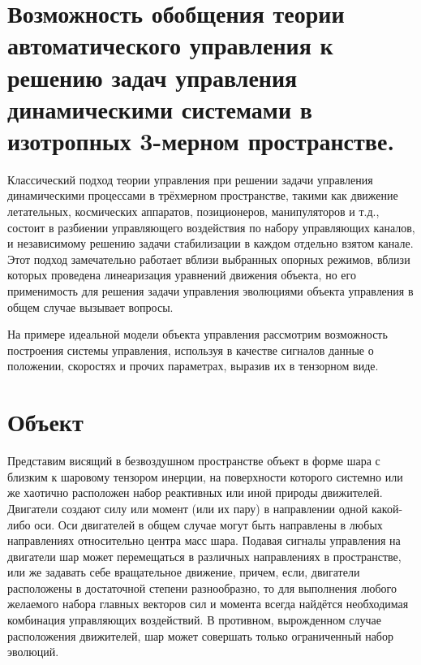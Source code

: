 \documentclass[a4paper]{article}
\begin{document}

\section{Возможность обобщения теории автоматического управления к решению задач управления динамическими системами в изотропных 3-мерном пространстве.}
Классический подход теории управления при решении задачи управления динамическими процессами в трёхмерном пространстве, такими как движение летательных, космических аппаратов, позиционеров, манипуляторов и т.д., состоит в разбиении управляющего воздействия по набору управляющих каналов, и независимому решению задачи стабилизации в каждом отдельно взятом канале. Этот подход замечательно работает вблизи выбранных опорных режимов, вблизи которых проведена линеаризация уравнений движения объекта, но его применимость для решения задачи управления эволюциями объекта управления в общем случае вызывает вопросы.

На примере идеальной модели объекта управления рассмотрим возможность построения системы управления, используя в качестве сигналов данные о положении, скоростях и прочих параметрах, выразив их в тензорном виде.

\section{Объект}
Представим висящий в безвоздушном пространстве объект в форме шара с близким к шаровому тензором инерции, на поверхности которого системно или же хаотично расположен набор реактивных или иной природы движителей. Двигатели создают силу или момент (или их пару) в направлении одной какой-либо оси. Оси двигателей в общем случае могут быть направлены в любых направлениях относительно центра масс шара. Подавая сигналы управления на двигатели шар может перемещаться в различных направлениях в пространстве, или же задавать себе вращательное движение, причем, если, двигатели расположены в достаточной степени разнообразно, то для выполнения любого желаемого набора главных векторов сил и момента всегда найдётся необходимая комбинация управляющих воздействий. В противном, вырожденном случае расположения движителей, шар может совершать только ограниченный набор эволюций.
\end{document}

